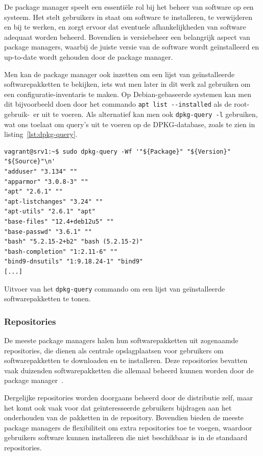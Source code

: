 De package manager speelt een essenti\"ele rol bij het beheer van software op een systeem.
Het stelt gebruikers in staat om software te installeren, te verwijderen en bij te werken, en zorgt ervoor dat eventuele afhankelijkheden van software adequaat worden beheerd.
Bovendien is versiebeheer een belangrijk aspect van package managers, waarbij de juiste versie van de software wordt ge\"installeerd en up-to-date wordt gehouden door de package manager.

Men kan de package manager ook inzetten om een lijst van ge\"installeerde softwarepakketten te bekijken, iets wat men later in dit werk zal gebruiken om een configuratie-inventaris te maken.
Op Debian-gebaseerde systemen kan men dit bijvoorbeeld doen door het commando \texttt{apt list -{}-installed} als de root-gebruik-\ er uit te voeren.
Als alternatief kan men ook \texttt{dpkg-query -l} gebruiken, wat ons toelaat om query's uit te voeren op de DPKG-database, zoals te zien in listing~\ref{lst:dpkg-query}.

\begin{listing}
  \begin{verbatim}
vagrant@srv1:~$ sudo dpkg-query -Wf '"${Package}" "${Version}" "${Source}"\n'
"adduser" "3.134" ""
"apparmor" "3.0.8-3" ""
"apt" "2.6.1" ""
"apt-listchanges" "3.24" ""
"apt-utils" "2.6.1" "apt"
"base-files" "12.4+deb12u5" ""
"base-passwd" "3.6.1" ""
"bash" "5.2.15-2+b2" "bash (5.2.15-2)"
"bash-completion" "1:2.11-6" ""
"bind9-dnsutils" "1:9.18.24-1" "bind9"
[...]
  \end{verbatim}
    \caption[Lijst van ge\"{i}nstalleerde softwarepakketten.]{Uitvoer van het \texttt{dpkg-query} commando om een lijst van ge\"installeerde softwarepakketten te tonen.}
  \label{lst:dpkg-query}
\end{listing}

\subsubsection{Repositories}
\label{linux_repositories}

De meeste package managers halen hun softwarepakketten uit zogenaamde repositories, die dienen als centrale opslagplaatsen voor gebruikers om softwarepakketten te downloaden en te installeren.
Deze repositories bevatten vaak duizenden softwarepakketten die allemaal beheerd kunnen worden door de package manager~\autocite{shotts2019linux}.

Dergelijke repositories worden doorgaans beheerd door de distributie zelf, maar het komt ook vaak voor dat ge\"interesseerde gebruikers bijdragen aan het onderhouden van de pakketten in de repository.
Bovendien bieden de meeste package managers de flexibiliteit om extra repositories toe te voegen, waardoor gebruikers software kunnen installeren die niet beschikbaar is in de standaard repositories.

